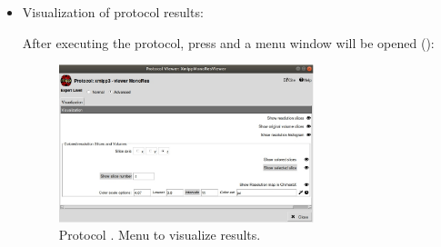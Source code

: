\begin{itemize}
  \item Visualization of protocol results:
  
  After executing the protocol, press  and a menu window will be opened ():
  
  \begin{figure}[H]
     \centering 
     \captionsetup{width=.9\linewidth} 
     \includegraphics[width=0.70\textwidth]{Images_appendix/Fig209.pdf}
     \caption{Protocol . Menu to visualize results.}
     \label{fig:app_localMonoRes_2}
    \end{figure}
    

\end{itemize}
